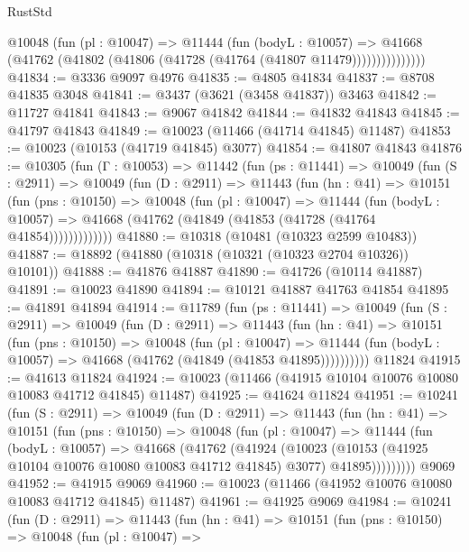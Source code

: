 \begin{lexlean}{RustStd}
\begin{coremodule}
                @10048
                  (fun (pl : @10047) =>
                  @11444
                    (fun (bodyL : @10057) =>
                    @41668 (@41762 (@41802 (@41806 (@41728 (@41764 (@41807 @11479)))))))))))))))
@41834 := @3336 @9097 @4976
@41835 := @4805 @41834
@41837 := @8708 @41835 @3048
@41841 := @3437 (@3621 (@3458 @41837)) @3463
@41842 := @11727 @41841
@41843 := @9067 @41842
@41844 := @41832 @41843
@41845 := @41797 @41843
@41849 := @10023 (@11466 (@41714 @41845) @11487)
@41853 := @10023 (@10153 (@41719 @41845) @3077)
@41854 := @41807 @41843
@41876 := @10305
    (fun (Γ : @10053) =>
    @11442
      (fun (ps : @11441) =>
      @10049
        (fun (S : @2911) =>
        @10049
          (fun (D : @2911) =>
          @11443
            (fun (hn : @41) =>
            @10151
              (fun (pns : @10150) =>
              @10048
                (fun (pl : @10047) =>
                @11444
                  (fun (bodyL : @10057) =>
                  @41668 (@41762 (@41849 (@41853 (@41728 (@41764 @41854)))))))))))))
@41880 := @10318 (@10481 (@10323 @2599 @10483))
@41887 := @18892 (@41880 (@10318 (@10321 (@10323 @2704 @10326)) @10101))
@41888 := @41876 @41887
@41890 := @41726 (@10114 @41887)
@41891 := @10023 @41890
@41894 := @10121 @41887 @41763 @41854
@41895 := @41891 @41894
@41914 := @11789
    (fun (ps : @11441) =>
    @10049
      (fun (S : @2911) =>
      @10049
        (fun (D : @2911) =>
        @11443
          (fun (hn : @41) =>
          @10151
            (fun (pns : @10150) =>
            @10048
              (fun (pl : @10047) =>
              @11444 (fun (bodyL : @10057) => @41668 (@41762 (@41849 (@41853 @41895))))))))))
    @11824
@41915 := @41613 @11824
@41924 := @10023 (@11466 (@41915 @10104 @10076 @10080 @10083 @41712 @41845) @11487)
@41925 := @41624 @11824
@41951 := @10241
    (fun (S : @2911) =>
    @10049
      (fun (D : @2911) =>
      @11443
        (fun (hn : @41) =>
        @10151
          (fun (pns : @10150) =>
          @10048
            (fun (pl : @10047) =>
            @11444
              (fun (bodyL : @10057) =>
              @41668
                (@41762
                  (@41924
                    (@10023
                      (@10153 (@41925 @10104 @10076 @10080 @10083 @41712 @41845) @3077)
                      @41895)))))))))
    @9069
@41952 := @41915 @9069
@41960 := @10023 (@11466 (@41952 @10076 @10080 @10083 @41712 @41845) @11487)
@41961 := @41925 @9069
@41984 := @10241
    (fun (D : @2911) =>
    @11443
      (fun (hn : @41) =>
      @10151
        (fun (pns : @10150) =>
        @10048
          (fun (pl : @10047) =>

\end{coremodule}
\end{lexlean}
